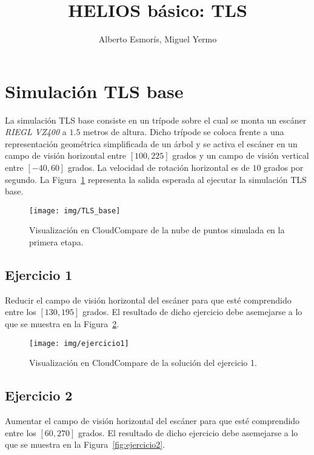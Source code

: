 \documentclass[]{article}
\title{HELIOS básico: TLS}
\author{Alberto Esmorís, Miguel Yermo}
\date{}
\begin{document}
	
	\maketitle
	
	
	
	\section*{Simulación TLS base}
	La simulación TLS base consiste en un trípode sobre el cual se monta un escáner \textit{RIEGL VZ400} a $1.5$ metros de altura. Dicho trípode se coloca frente a una representación geométrica simplificada de un árbol y se activa el escáner en un campo de visión horizontal entre $[100, 225]$ grados y un campo de visión vertical entre $[-40, 60]$ grados. La velocidad de rotación horizontal es de $10$ grados por segundo. La Figura~\ref{fig:tls_base} representa la salida esperada al ejecutar la simulación TLS base.
	
	\begin{figure}[htb]
		\centering
		\texttt{[image: img/TLS\_base]}
		\caption{Visualización en CloudCompare de la nube de puntos simulada en la primera etapa.}
		\label{fig:tls_base}
	\end{figure}


	\pagebreak
	

	\subsection*{Ejercicio 1}
	Reducir el campo de visión horizontal del escáner para que esté comprendido entre los $[130, 195]$ grados. El resultado de dicho ejercicio debe asemejarse a lo que se muestra en la Figura~\ref{fig:ejercicio1}.
	
	\begin{figure}[htb]
		\centering
		\texttt{[image: img/ejercicio1]}
		\caption{Visualización en CloudCompare de la solución del ejercicio 1.}
		\label{fig:ejercicio1}	
	\end{figure}


	\subsection*{Ejercicio 2}
	Aumentar el campo de visión horizontal del escáner para que esté comprendido entre los $[60, 270]$ grados. El resultado de dicho ejercicio debe asemejarse a lo que se muestra en la Figura~\ref{fig:ejercicio2}.
	
\end{document}
